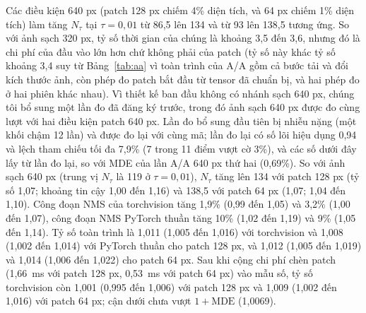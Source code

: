 \documentclass[a4paper,fleqn]{cas-dc}
\newcommand{\Ntau}{N_{\tau}}
\begin{document}
Các điều kiện 640 px (patch 128 px chiếm 4\% diện tích, và 64 px chiếm 1\% diện tích) làm tăng $\Ntau$ tại $\tau=0{,}01$ từ 86,5 lên 134 và từ 93 lên 138,5 tương ứng. So với ảnh sạch 320 px, tỷ số thời gian của chúng là khoảng 3,5 đến 3,6, nhưng đó là chi phí của đầu vào lớn hơn chứ không phải của patch (tỷ số này khác tỷ số khoảng 3,4 suy từ Bảng~\ref{tab:aa} vì toàn trình của A/A gồm cả bước tải và đổi kích thước ảnh, còn phép đo patch bắt đầu từ tensor đã chuẩn bị, và hai phép đo ở hai phiên khác nhau). Vì thiết kế ban đầu không có nhánh sạch 640 px, chúng tôi bổ sung một lần đo đã đăng ký trước, trong đó ảnh sạch 640 px được đo cùng lượt với hai điều kiện patch 640 px. Lần đo bổ sung đầu tiên bị nhiễu nặng (một khối chậm 12 lần) và được đo lại với cùng mã; lần đo lại có số lõi hiệu dụng 0,94 và lệch tham chiếu tối đa 7,9\% (7 trong 11 điểm vượt cờ 3\%), và các số dưới đây lấy từ lần đo lại, so với MDE của lần A/A 640 px thứ hai (0,69\%). So với ảnh sạch 640 px (trung vị $\Ntau$ là 119 ở $\tau=0{,}01$), $\Ntau$ tăng lên 134 với patch 128 px (tỷ số 1,07; khoảng tin cậy 1,00 đến 1,16) và 138,5 với patch 64 px (1,07; 1,04 đến 1,10). Công đoạn NMS của torchvision tăng 1,9\% (0,99 đến 1,05) và 3,2\% (1,00 đến 1,07), công đoạn NMS PyTorch thuần tăng 10\% (1,02 đến 1,19) và 9\% (1,05 đến 1,14). Tỷ số toàn trình là 1,011 (1,005 đến 1,016) với torchvision và 1,008 (1,002 đến 1,014) với PyTorch thuần cho patch 128 px, và 1,012 (1,005 đến 1,019) và 1,014 (1,006 đến 1,022) cho patch 64 px. Sau khi cộng chi phí chèn patch (1,66~ms với patch 128 px, 0,53~ms với patch 64 px) vào mẫu số, tỷ số torchvision còn 1,001 (0,995 đến 1,006) với patch 128 px và 1,009 (1,002 đến 1,016) với patch 64 px; cận dưới chưa vượt $1+\mathrm{MDE}$ (1,0069).
\end{document}
